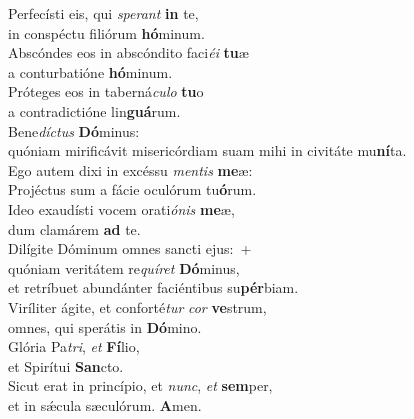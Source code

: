 \evenverse Perfecísti eis, qui \textit{spe}\textit{rant} \textbf{in} te,~\*\\
\evenverse in conspéctu filiórum \textbf{hó}minum.\\
\oddverse Abscóndes eos in abscóndito faci\textit{é}\textit{i} \textbf{tu}æ~\*\\
\oddverse a conturbatióne \textbf{hó}minum.\\
\evenverse Próteges eos in taberná\textit{cu}\textit{lo} \textbf{tu}o~\*\\
\evenverse a contradictióne lin\textbf{guá}rum.\\
\oddverse Bene\textit{dí}\textit{ctus} \textbf{Dó}minus:~\*\\
\oddverse quóniam mirificávit misericórdiam suam mihi in civitáte mu\textbf{ní}ta.\\
\evenverse Ego autem dixi in excéssu \textit{men}\textit{tis} \textbf{me}æ:~\*\\
\evenverse Projéctus sum a fácie oculórum tu\textbf{ó}rum.\\
\oddverse Ideo exaudísti vocem orati\textit{ó}\textit{nis} \textbf{me}æ,~\*\\
\oddverse dum clamárem \textbf{ad} te.\\
\evenverse Dilígite Dóminum omnes sancti ejus:~+\\
\evenverse  quóniam veritátem re\textit{quí}\textit{ret} \textbf{Dó}minus,~\*\\
\evenverse et retríbuet abundánter faciéntibus su\textbf{pér}biam.\\
\oddverse Viríliter ágite, et conforté\textit{tur} \textit{cor} \textbf{ve}strum,~\*\\
\oddverse omnes, qui sperátis in \textbf{Dó}mino.\\
\evenverse Glória Pa\textit{tri}, \textit{et} \textbf{Fí}lio,~\*\\
\evenverse et Spirítui \textbf{San}cto.\\
\oddverse Sicut erat in princípio, et \textit{nunc}, \textit{et} \textbf{sem}per,~\*\\
\oddverse et in sǽcula sæculórum. \textbf{A}men.\\
